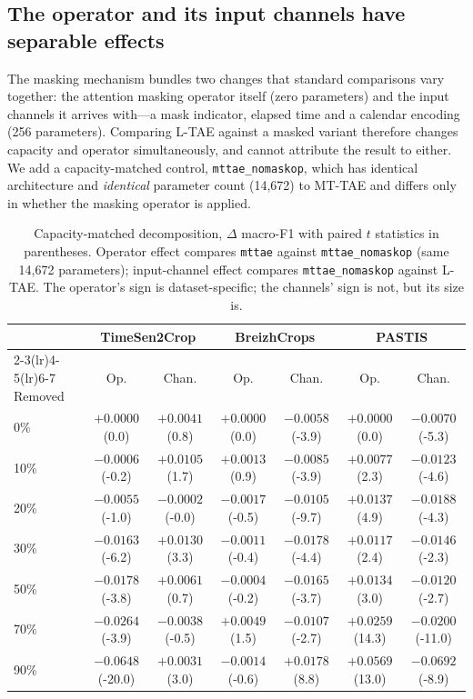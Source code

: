 \documentclass[journal]{IEEEtran}
\begin{document}
\subsection{The operator and its input channels have separable effects}
\label{sec:decomp}

The masking mechanism bundles two changes that standard comparisons vary
together: the attention masking operator itself (zero parameters) and the input
channels it arrives with---a mask indicator, elapsed time and a calendar
encoding (256 parameters). Comparing L-TAE against a masked variant therefore
changes capacity and operator simultaneously, and cannot attribute the result to
either. We add a capacity-matched control, \texttt{mttae\_nomaskop}, which has
identical architecture and \emph{identical} parameter count (14{,}672) to
MT-TAE and differs only in whether the masking operator is applied.

\begin{table}[t]
\centering
\caption{Capacity-matched decomposition, $\Delta$ macro-F1 with paired $t$
statistics in parentheses. Operator effect compares \texttt{mttae} against
\texttt{mttae\_nomaskop} (same 14{,}672 parameters); input-channel effect
compares \texttt{mttae\_nomaskop} against L-TAE. The operator's sign is
dataset-specific; the channels' sign is not, but its size is.}
\label{tab:decomp}
\footnotesize
\begin{tabular}{lcccccc}
\toprule
 & \multicolumn{2}{c}{TimeSen2Crop} & \multicolumn{2}{c}{BreizhCrops}
 & \multicolumn{2}{c}{PASTIS} \\
\cmidrule(lr){2-3}\cmidrule(lr){4-5}\cmidrule(lr){6-7}
Removed & Op. & Chan. & Op. & Chan. & Op. & Chan. \\
\midrule
0\%  & $+0.0000$ (0.0)   & $+0.0041$ (0.8)   & $+0.0000$ (0.0)   & $-0.0058$ (-3.9)  & $+0.0000$ (0.0)   & $-0.0070$ (-5.3) \\
10\% & $-0.0006$ (-0.2)  & $+0.0105$ (1.7)   & $+0.0013$ (0.9)   & $-0.0085$ (-3.9)  & $+0.0077$ (2.3)   & $-0.0123$ (-4.6) \\
20\% & $-0.0055$ (-1.0)  & $-0.0002$ (-0.0)  & $-0.0017$ (-0.5)  & $-0.0105$ (-9.7)  & $+0.0137$ (4.9)   & $-0.0188$ (-4.3) \\
30\% & $-0.0163$ (-6.2)  & $+0.0130$ (3.3)   & $-0.0011$ (-0.4)  & $-0.0178$ (-4.4)  & $+0.0117$ (2.4)   & $-0.0146$ (-2.3) \\
50\% & $-0.0178$ (-3.8)  & $+0.0061$ (0.7)   & $-0.0004$ (-0.2)  & $-0.0165$ (-3.7)  & $+0.0134$ (3.0)   & $-0.0120$ (-2.7) \\
70\% & $-0.0264$ (-3.9)  & $-0.0038$ (-0.5)  & $+0.0049$ (1.5)   & $-0.0107$ (-2.7)  & $+0.0259$ (14.3)  & $-0.0200$ (-11.0) \\
90\% & $-0.0648$ (-20.0) & $+0.0031$ (3.0)   & $-0.0014$ (-0.6)  & $+0.0178$ (8.8)   & $+0.0569$ (13.0)  & $-0.0692$ (-8.9) \\
\bottomrule
\end{tabular}
\end{table}
\end{document}
